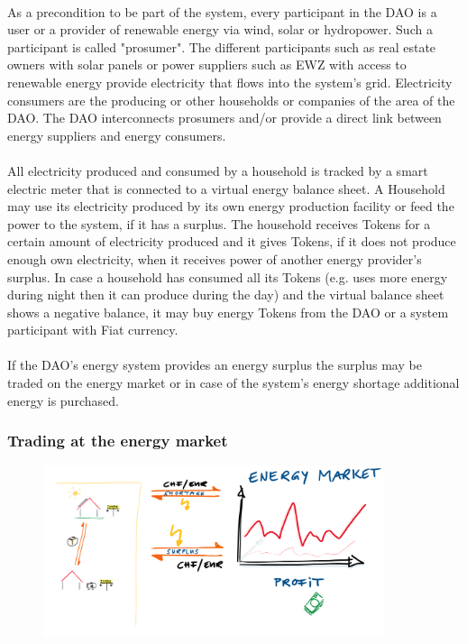 \documentclass{scrartcl}
\begin{document}
	\paragraph{}
	As a precondition to be part of the system, every participant in the DAO is a user or a provider of renewable energy via wind, solar or hydropower. Such a participant is called "prosumer". The different participants such as real estate owners with solar panels or power suppliers such as EWZ with access to renewable energy provide electricity that flows into the system's grid. Electricity consumers are the producing or other households or companies of the area of the DAO. The DAO interconnects prosumers and/or provide a direct link between energy suppliers and energy consumers.
	
	\paragraph{}
	All electricity produced and consumed by a household is tracked by a smart electric meter that is connected to a virtual energy balance sheet.  A Household may use its electricity produced by its own energy production facility or feed the power to the system, if it has a surplus. The household receives Tokens for a certain amount of electricity produced and it gives Tokens, if it does not produce enough own electricity, when it receives power of another energy provider's surplus. In case a household has consumed all its Tokens (e.g. uses more energy during night then it can produce during the day) and the virtual balance sheet shows a negative balance, it may buy energy Tokens from the DAO or a system participant with Fiat currency.
	
	\paragraph{}
	If the DAO's energy system provides an energy surplus the surplus may be traded on the energy market or in case of the system's energy shortage additional energy is purchased.
	
	\subsubsection{Trading at the energy market}
	
	\begin{figure} [h]
		\centering
		\includegraphics[width=100mm,scale=0.5]{section_3_3_2.png}
	\end{figure}
	
\end{document}

